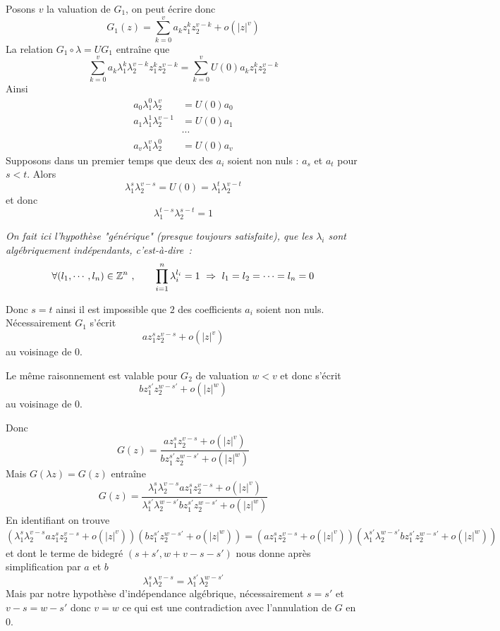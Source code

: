\documentclass[a4paper]{article}
\begin{document}
Posons $v$ la valuation de $G_1$, on peut écrire donc
\[
G_1(z) = \sum_{k=0}^v a_k z_1^kz_2^{v-k} + o(|z|^v)
\]
La relation $G_1 \circ \lambda = UG_1$ entraîne que
\[
\sum_{k=0}^v a_k \lambda_1^k\lambda_2^{v-k}z_1^kz_2^{v-k} = \sum_{k=0}^v U(0)a_k z_1^kz_2^{v-k}
\]
Ainsi
\begin{align*}
a_0\lambda_1^0\lambda_2^{v} &= U(0) a_0\\
a_1\lambda_1^1\lambda_2^{v-1} &= U(0) a_1\\
&\cdots\\
a_v \lambda_1^v \lambda_2^0 &= U(0) a_v
\end{align*}
Supposons dans un premier temps que deux des $a_i$ soient non nuls : $a_s$ et $a_t$ pour $s<t$. Alors
\begin{equation}
\lambda_1^s \lambda_2^{v-s} = U(0) = \lambda_1^t\lambda_2^{v-t}
\end{equation}
et donc
\[
\lambda_1^{t-s}\lambda_2^{s-t} = 1
\]

\textit{On fait ici l'hypothèse "générique" (presque toujours satisfaite), que les $\lambda_i$ sont algébriquement indépendants, c'est-à-dire~:}
\[
\forall (l_1,\cdots, l_n) \in \mathbb{Z}^n\ ,\qquad \prod_{i =1}^n \lambda_i^{l_i} = 1 \ \Rightarrow\ l_1=l_2=\cdots =l_n = 0
\]

Donc $s=t$ ainsi il est impossible que $2$ des coefficients $a_i$ soient non nuls. Nécessairement $G_1$ s'écrit 
\[
a z_1^s z_2^{v-s} + o(|z|^v)
\] au voisinage de $0$.

Le même raisonnement est valable pour $G_2$ de valuation $w < v$ et donc s'écrit
\[
b z_1^{s'} z_2^{w-s'} +  o(|z|^w)
\] au voisinage de $0$.

Donc
\[
G(z) = \dfrac{a z_1^s z_2^{v-s} + o(|z|^v)}{b z_1^{s'} z_2^{w-s'} +  o(|z|^w)}
\]%
Mais $G(\lambda z) = G(z)$ entraîne
\[
G(z) = \dfrac{\lambda_1^{s}\lambda_2^{v-s} a z_1^s z_2^{v-s} + o(|z|^v)}{\lambda_1^{s'}\lambda_2^{w-s'}b z_1^{s'} z_2^{w-s'} +  o(|z|^w)}
\]
En identifiant on trouve
\[
\left(\lambda_1^{s}\lambda_2^{v-s}a z_1^s z_2^{v-s} + o(|z|^v)\right)\left(b z_1^{s'} z_2^{w-s'} + o(|z|^w)\right) =\left(a z_1^s z_2^{v-s} + o(|z|^v)\right)\left( \lambda_1^{s'}\lambda_2^{w-s'}b z_1^{s'} z_2^{w-s'} + o(|z|^w)\right)
\]
et dont le terme de bidegré $(s+s',w+v-s-s')$ nous donne après simplification par $a$ et $b$
\[
\lambda_1^{s}\lambda_2^{v-s} = \lambda_1^{s'}\lambda_2^{w-s'}
\]
Mais par notre hypothèse d'indépendance algébrique, nécessairement $s=s'$ et $v-s=w-s'$ donc $v=w$ ce qui est une contradiction avec l'annulation de $G$ en $0$.
\end{document}
